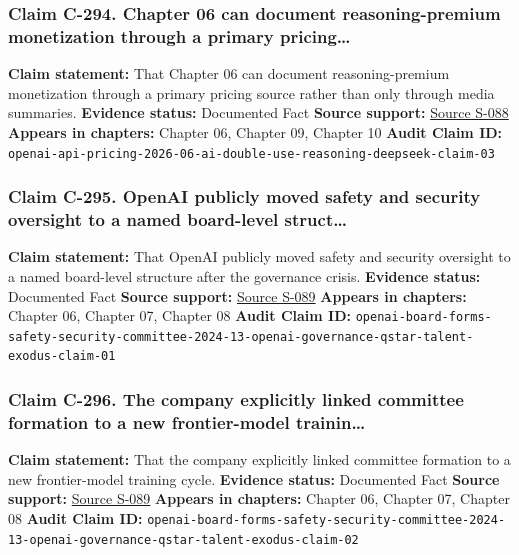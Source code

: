 \documentclass[
  american,
  11pt,
  letterpaper,
]{article}
\begin{document}
\subsubsection{Claim C-294. Chapter 06 can document reasoning-premium
monetization through a primary
pricing\ldots{}}\label{claim-c-294-chapter-06-can-document-reasoning-premium-monetization-through-a-primary-pricing}

\textbf{Claim statement:} That Chapter 06 can document reasoning-premium
monetization through a primary pricing source rather than only through
media summaries. \textbf{Evidence status:} Documented Fact
\textbf{Source support:}
\hyperref[source-s-088-pricing-openai-api]{Source S-088} \textbf{Appears
in chapters:} Chapter 06, Chapter 09, Chapter 10 \textbf{Audit Claim
ID:}
\texttt{openai-api-pricing-2026-06-ai-double-use-reasoning-deepseek-claim-03}

\subsubsection{Claim C-295. OpenAI publicly moved safety and security
oversight to a named board-level
struct\ldots{}}\label{claim-c-295-openai-publicly-moved-safety-and-security-oversight-to-a-named-board-level-struct}

\textbf{Claim statement:} That OpenAI publicly moved safety and security
oversight to a named board-level structure after the governance crisis.
\textbf{Evidence status:} Documented Fact \textbf{Source support:}
\hyperref[source-s-089-openai-board-forms-safety-and-security-committee]{Source
S-089} \textbf{Appears in chapters:} Chapter 06, Chapter 07, Chapter 08
\textbf{Audit Claim ID:}
\texttt{openai-board-forms-safety-security-committee-2024-13-openai-governance-qstar-talent-exodus-claim-01}

\subsubsection{Claim C-296. The company explicitly linked committee
formation to a new frontier-model
trainin\ldots{}}\label{claim-c-296-the-company-explicitly-linked-committee-formation-to-a-new-frontier-model-trainin}

\textbf{Claim statement:} That the company explicitly linked committee
formation to a new frontier-model training cycle. \textbf{Evidence
status:} Documented Fact \textbf{Source support:}
\hyperref[source-s-089-openai-board-forms-safety-and-security-committee]{Source
S-089} \textbf{Appears in chapters:} Chapter 06, Chapter 07, Chapter 08
\textbf{Audit Claim ID:}
\texttt{openai-board-forms-safety-security-committee-2024-13-openai-governance-qstar-talent-exodus-claim-02}
\end{document}
